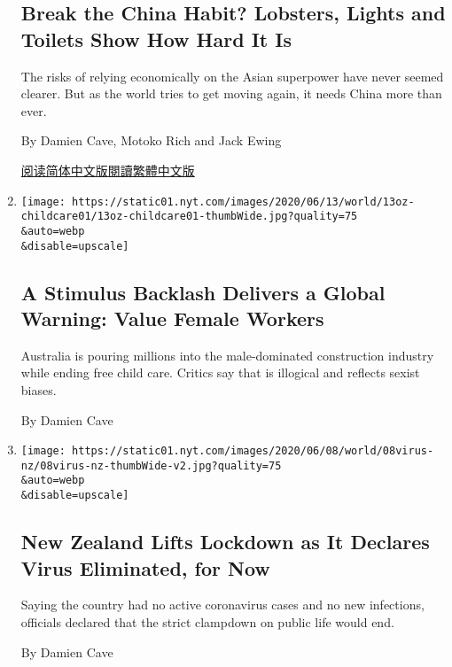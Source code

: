 \begin{enumerate}
  \hypertarget{break-the-china-habit-lobsters-lights-and-toilets-show-how-hard-it-is}{%
  \subsection{Break the China Habit? Lobsters, Lights and Toilets Show
  How Hard It
  Is}\label{break-the-china-habit-lobsters-lights-and-toilets-show-how-hard-it-is}}

  The risks of relying economically on the Asian superpower have never
  seemed clearer. But as the world tries to get moving again, it needs
  China more than ever.

  By Damien Cave, Motoko Rich and Jack Ewing

  \href{https://cn.nytimes.com/business/20200615/china-decoupling/}{阅读简体中文版}\href{https://cn.nytimes.com/business/20200615/china-decoupling/zh-hant/}{閱讀繁體中文版}
\item
  \href{/2020/06/14/world/australia/coronavirus-stimulus-childcare-women.html}{}

  \texttt{[image: https://static01.nyt.com/images/2020/06/13/world/13oz-childcare01/13oz-childcare01-thumbWide.jpg?quality=75\\\&auto=webp\\\&disable=upscale]}

  \hypertarget{a-stimulus-backlash-delivers-a-global-warning-value-female-workers}{%
  \subsection{A Stimulus Backlash Delivers a Global Warning: Value
  Female
  Workers}\label{a-stimulus-backlash-delivers-a-global-warning-value-female-workers}}

  Australia is pouring millions into the male-dominated construction
  industry while ending free child care. Critics say that is illogical
  and reflects sexist biases.

  By Damien Cave
\item
  \href{/2020/06/08/world/australia/new-zealand-coronavirus-ardern.html}{}

  \texttt{[image: https://static01.nyt.com/images/2020/06/08/world/08virus-nz/08virus-nz-thumbWide-v2.jpg?quality=75\\\&auto=webp\\\&disable=upscale]}

  \hypertarget{new-zealand-lifts-lockdown-as-it-declares-virus-eliminated-for-now}{%
  \subsection{New Zealand Lifts Lockdown as It Declares Virus
  Eliminated, for
  Now}\label{new-zealand-lifts-lockdown-as-it-declares-virus-eliminated-for-now}}

  Saying the country had no active coronavirus cases and no new
  infections, officials declared that the strict clampdown on public
  life would end.

  By Damien Cave
\end{enumerate}

